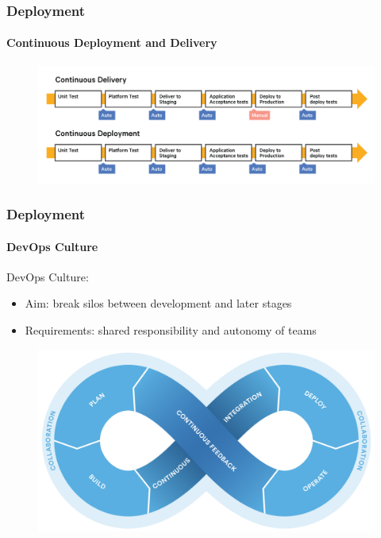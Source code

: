 \documentclass{beamer}
\begin{document}
\begin{frame}
	\frametitle{Deployment}
	\framesubtitle{Continuous Deployment and Delivery}
	\begin{figure}
		\begin{center}
			\includegraphics[scale=0.5]{delivery}
		\end{center}
	\end{figure}
\end{frame}

\begin{frame}
	\frametitle{Deployment}
	\framesubtitle{DevOps Culture}

DevOps Culture:
	\begin{itemize}
		\item Aim: break silos between development and later stages 
		\item Requirements: shared responsibility and autonomy of teams
	\end{itemize}
	\begin{figure}
		\begin{center}
 			\includegraphics[scale=0.12]{devopsloop}
		\end{center}
	\end{figure}

\end{frame}
\end{document}
